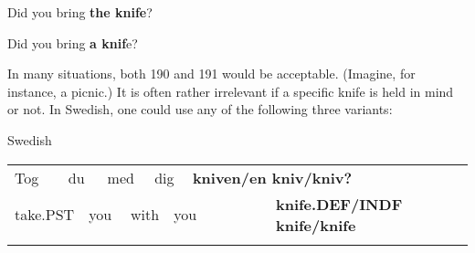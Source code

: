 \begin{listWWNumileveli}
\item {}

\begin{styleExample}
\label{bkm:Ref123724733}Did you bring \textbf{the knife}?

\end{styleExample}

\item {}

\begin{styleExample}
\label{bkm:Ref123724734}Did you bring \textbf{a knif}e?

\end{styleExample}

\end{listWWNumileveli}

\begin{styleBodyTextFirst}
In many situations, both 190 and 191 would be acceptable. (Imagine, for instance, a picnic.) It is often rather irrelevant if a specific knife is held in mind or not. In Swedish, one could use any of the following three variants:

\end{styleBodyTextFirst}

\begin{listWWNumileveli}
\item {}

\begin{styleExample}
Swedish

\end{styleExample}

\end{listWWNumileveli}

\begin{tabular}{llllllllll}
\lsptoprule
Tog & \multicolumn{2}{l}{du

} & \multicolumn{2}{l}{med

} & \multicolumn{2}{l}{dig

} & \multicolumn{2}{l}{{\bfseries kniven/en kniv/kniv?}

} & \\
\multicolumn{2}{l}{take.PST

} & \multicolumn{2}{l}{you

} & \multicolumn{2}{l}{with

} & \multicolumn{2}{l}{you

} & \multicolumn{2}{l}{{\bfseries knife.DEF/INDF knife/knife}

}\\
\lspbottomrule
\end{tabular}

